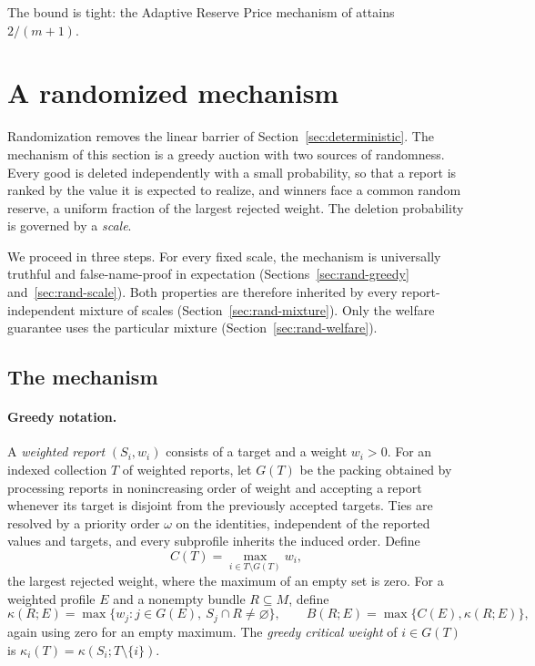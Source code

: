 \documentclass[format=acmsmall, review=false]{acmart}
\begin{document}
The bound is tight: the Adaptive Reserve Price mechanism of
\cite{iwasaki2010worst} attains $2/(m+1)$.

\section{A randomized mechanism}
\label{sec:randomized}

Randomization removes the linear barrier of
Section~\ref{sec:deterministic}. The mechanism of this section is
a greedy auction with two sources of randomness. Every good is
deleted independently with a small probability, so that a report
is ranked by the value it is expected to realize, and winners
face a common random reserve, a uniform fraction of the largest
rejected weight. The deletion probability is governed by a
\emph{scale}.

We proceed in three steps. For every fixed scale, the mechanism
is universally truthful and false-name-proof in expectation
(Sections~\ref{sec:rand-greedy} and~\ref{sec:rand-scale}). Both
properties are therefore inherited by every report-independent
mixture of scales (Section~\ref{sec:rand-mixture}). Only the
welfare guarantee uses the particular mixture
(Section~\ref{sec:rand-welfare}).

\subsection{The mechanism}
\label{sec:rand-mechanism}

\paragraph{Greedy notation.}
A \emph{weighted report} \((S_i,w_i)\) consists of a target and a
weight \(w_i>0\). For an indexed collection \(T\) of weighted
reports, let \(G(T)\) be the packing obtained by processing
reports in nonincreasing order of weight and accepting a report
whenever its target is disjoint from the previously accepted
targets. Ties are resolved by a priority order \(\omega\) on the
identities, independent of the reported values and targets, and
every subprofile inherits the induced order. Define
\[
C(T)=\max_{i\in T\setminus G(T)}w_i,
\]
the largest rejected weight, where the maximum of an empty set is
zero. For a weighted profile \(E\) and a nonempty bundle
\(R\subseteq M\), define
\[
\kappa(R;E)=
\max\bigl\{
w_j:j\in G(E),\
S_j\cap R\ne\varnothing
\bigr\},
\qquad
B(R;E)=\max\{C(E),\kappa(R;E)\},
\]
again using zero for an empty maximum. The \emph{greedy critical
weight} of \(i\in G(T)\) is
\(\kappa_i(T)=\kappa(S_i;T\setminus\{i\})\).
\end{document}
